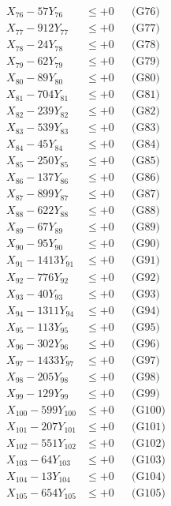 \documentclass[a4paper,10pt]{article}
\begin{document}
{\begin{align}
X_{76} - 57Y_{76} &\leq +0 && \text{(G76)} \\
X_{77} - 912Y_{77} &\leq +0 && \text{(G77)} \\
X_{78} - 24Y_{78} &\leq +0 && \text{(G78)} \\
X_{79} - 62Y_{79} &\leq +0 && \text{(G79)} \\
X_{80} - 89Y_{80} &\leq +0 && \text{(G80)} \\
\allowbreak
X_{81} - 704Y_{81} &\leq +0 && \text{(G81)} \\
X_{82} - 239Y_{82} &\leq +0 && \text{(G82)} \\
X_{83} - 539Y_{83} &\leq +0 && \text{(G83)} \\
X_{84} - 45Y_{84} &\leq +0 && \text{(G84)} \\
X_{85} - 250Y_{85} &\leq +0 && \text{(G85)} \\
X_{86} - 137Y_{86} &\leq +0 && \text{(G86)} \\
X_{87} - 899Y_{87} &\leq +0 && \text{(G87)} \\
X_{88} - 622Y_{88} &\leq +0 && \text{(G88)} \\
X_{89} - 67Y_{89} &\leq +0 && \text{(G89)} \\
X_{90} - 95Y_{90} &\leq +0 && \text{(G90)} \\
\allowbreak
X_{91} - 1413Y_{91} &\leq +0 && \text{(G91)} \\
X_{92} - 776Y_{92} &\leq +0 && \text{(G92)} \\
X_{93} - 40Y_{93} &\leq +0 && \text{(G93)} \\
X_{94} - 1311Y_{94} &\leq +0 && \text{(G94)} \\
X_{95} - 113Y_{95} &\leq +0 && \text{(G95)} \\
X_{96} - 302Y_{96} &\leq +0 && \text{(G96)} \\
X_{97} - 1433Y_{97} &\leq +0 && \text{(G97)} \\
X_{98} - 205Y_{98} &\leq +0 && \text{(G98)} \\
X_{99} - 129Y_{99} &\leq +0 && \text{(G99)} \\
X_{100} - 599Y_{100} &\leq +0 && \text{(G100)} \\
\allowbreak
X_{101} - 207Y_{101} &\leq +0 && \text{(G101)} \\
X_{102} - 551Y_{102} &\leq +0 && \text{(G102)} \\
X_{103} - 64Y_{103} &\leq +0 && \text{(G103)} \\
X_{104} - 13Y_{104} &\leq +0 && \text{(G104)} \\
X_{105} - 654Y_{105} &\leq +0 && \text{(G105)} \\

\end{align}}
\end{document}
